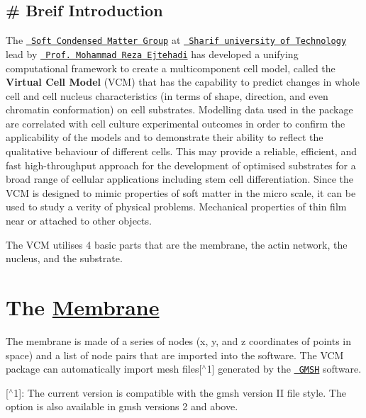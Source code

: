 \subsection*{\# Breif Introduction }

The \href{http://softmatter.physics.sharif.edu}{\texttt{ Soft Condensed Matter Group}} at \href{http://www.en.sharif.edu}{\texttt{ Sharif university of Technology}} lead by \href{http://sharif.edu/~ejtehadi/}{\texttt{ Prof. Mohammad Reza Ejtehadi}} has developed a unifying computational framework to create a multicomponent cell model, called the {\bfseries{Virtual Cell Model}} (V\+CM) that has the capability to predict changes in whole cell and cell nucleus characteristics (in terms of shape, direction, and even chromatin conformation) on cell substrates. Modelling data used in the package are correlated with cell culture experimental outcomes in order to confirm the applicability of the models and to demonstrate their ability to reflect the qualitative behaviour of different cells. This may provide a reliable, efficient, and fast high-\/throughput approach for the development of optimised substrates for a broad range of cellular applications including stem cell differentiation. Since the V\+CM is designed to mimic properties of soft matter in the micro scale, it can be used to study a verity of physical problems. Mechanical properties of thin film near or attached to other objects.

The V\+CM utilises 4 basic parts that are the membrane, the actin network, the nucleus, and the substrate.

\section*{The \mbox{\hyperlink{classMembrane}{Membrane}}}

The membrane is made of a series of nodes (x, y, and z coordinates of points in space) and a list of node pairs that are imported into the software. The V\+CM package can automatically import mesh files\mbox{[}$^\wedge$1\mbox{]} generated by the \href{http://gmsh.info}{\texttt{ G\+M\+SH}} software.

\mbox{[}$^\wedge$1\mbox{]}\+: The current version is compatible with the gmsh version II file style. The option is also available in gmsh versions 2 and above. 